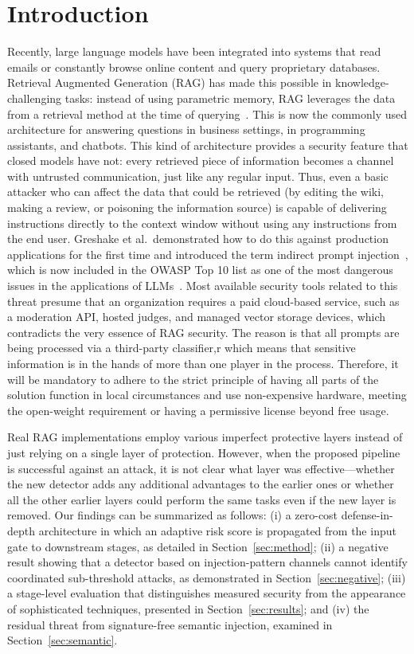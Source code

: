 \documentclass[conference]{IEEEtran}
\begin{document}
\section{Introduction}
Recently, large language models have been integrated into systems that read emails or constantly browse online content and query proprietary databases. Retrieval Augmented Generation (RAG) has made this possible in knowledge-challenging tasks: instead of using parametric memory, RAG leverages the data from a retrieval method at the time of querying~\cite{lewis2020rag}. This is now the commonly used architecture for answering questions in business settings, in programming assistants, and chatbots. This kind of architecture provides a security feature that closed models have not: every retrieved piece of information becomes a channel with untrusted communication, just like any regular input. Thus, even a basic attacker who can affect the data that could be retrieved (by editing the wiki, making a review, or poisoning the information source) is capable of delivering instructions directly to the context window without using any instructions from the end user. Greshake et al.\ demonstrated how to do this against production applications for the first time and introduced the term indirect prompt injection~\cite{greshake2023}, which is now included in the OWASP Top 10 list as one of the most dangerous issues in the applications of LLMs~\cite{owasp2025}. Most available security tools related to this threat presume that an organization requires a paid cloud-based service, such as a moderation API, hosted judges, and managed vector storage devices, which contradicts the very essence of RAG security. The reason is that all prompts are being processed via a third-party classifier,r which means that sensitive information is in the hands of more than one player in the process. Therefore, it will be mandatory to adhere to the strict principle of having all parts of the solution function in local circumstances and use non-expensive hardware, meeting the open-weight requirement or having a permissive license beyond free usage.

Real RAG implementations employ various imperfect protective layers instead of just relying on a single layer of protection. However, when the proposed pipeline is successful against an attack, it is not clear what layer was effective---whether the new detector adds any additional advantages to the earlier ones or whether all the other earlier layers could perform the same tasks even if the new layer is removed. Our findings can be summarized as follows: (i) a zero-cost defense-in-depth architecture in which an adaptive risk score is propagated from the input gate to downstream stages, as detailed in Section~\ref{sec:method}; (ii) a negative result showing that a detector based on injection-pattern channels cannot identify coordinated sub-threshold attacks, as demonstrated in Section~\ref{sec:negative}; (iii) a stage-level evaluation that distinguishes measured security from the appearance of sophisticated techniques, presented in Section~\ref{sec:results}; and (iv) the residual threat from signature-free semantic injection, examined in Section~\ref{sec:semantic}.
\end{document}
